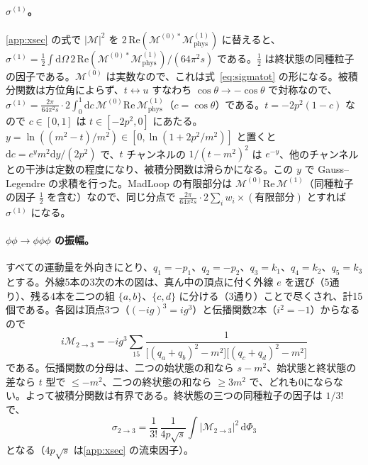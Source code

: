 \documentclass[a4paper,10pt]{ltjsarticle}
\newcommand{\dd}{\mathrm{d}}
\begin{document}
\paragraph{$\sigma^{(1)}$。}\ref{app:xsec} の式で $|\mathcal{M}|^2$ を $2\,\mathrm{Re}(\mathcal{M}^{(0)*}\mathcal{M}^{(1)}_{\mathrm{phys}})$ に替えると、$\sigma^{(1)}=\frac12\int\dd\Omega\,2\,\mathrm{Re}(\mathcal{M}^{(0)*}\mathcal{M}^{(1)}_{\mathrm{phys}})/(64\pi^2s)$ である。$\frac12$ は終状態の同種粒子の因子である。$\mathcal{M}^{(0)}$ は実数なので、これは式~\eqref{eq:sigmatot} の形になる。被積分関数は方位角によらず、$t\leftrightarrow u$ すなわち $\cos\theta\to-\cos\theta$ で対称なので、$\sigma^{(1)}=\frac{2\pi}{64\pi^2s}\cdot2\int_0^1\dd c\,\mathcal{M}^{(0)}\mathrm{Re}\,\mathcal{M}^{(1)}_{\mathrm{phys}}$（$c=\cos\theta$）である。$t=-2p^2(1-c)$ なので $c\in[0,1]$ は $t\in[-2p^2,0]$ にあたる。$y=\ln((m^2-t)/m^2)\in[0,\ln(1+2p^2/m^2)]$ と置くと $\dd c=e^ym^2\dd y/(2p^2)$ で、$t$ チャンネルの $1/(t-m^2)^2$ は $e^{-y}$、他のチャンネルとの干渉は定数の程度になり、被積分関数は滑らかになる。この $y$ で Gauss--Legendre の求積を行った。MadLoop の有限部分は $\mathcal{M}^{(0)}\mathrm{Re}\,\mathcal{M}^{(1)}$（同種粒子の因子 $\frac12$ を含む）なので、同じ分点で $\frac{2\pi}{64\pi^2s}\cdot2\sum_iw_i\times(\text{有限部分})$ とすれば $\sigma^{(1)}$ になる。

\paragraph{$\phi\phi\to\phi\phi\phi$ の振幅。}すべての運動量を外向きにとり、$q_1=-p_1$、$q_2=-p_2$、$q_3=k_1$、$q_4=k_2$、$q_5=k_3$ とする。外線5本の3次の木の図は、真ん中の頂点に付く外線 $e$ を選び（5通り）、残る4本を二つの組 $\{a,b\}$、$\{c,d\}$ に分ける（3通り）ことで尽くされ、計15個である。各図は頂点3つ（$(-ig)^3=ig^3$）と伝播関数2本（$i^2=-1$）からなるので
\begin{equation*}
i\mathcal{M}_{2\to3}=-ig^3\sum_{15}\frac{1}{\bigl[(q_a+q_b)^2-m^2\bigr]\bigl[(q_c+q_d)^2-m^2\bigr]}
\end{equation*}
である。伝播関数の分母は、二つの始状態の和なら $s-m^2$、始状態と終状態の差なら $t$ 型で $\le-m^2$、二つの終状態の和なら $\ge3m^2$ で、どれも0にならない。よって被積分関数は有界である。終状態の三つの同種粒子の因子は $1/3!$ で、
\begin{equation*}
\sigma_{2\to3}=\frac{1}{3!}\,\frac{1}{4p\sqrt s}\int|\mathcal{M}_{2\to3}|^2\,\dd\Phi_3
\end{equation*}
となる（$4p\sqrt s$ は\ref{app:xsec} の流束因子）。
\end{document}
